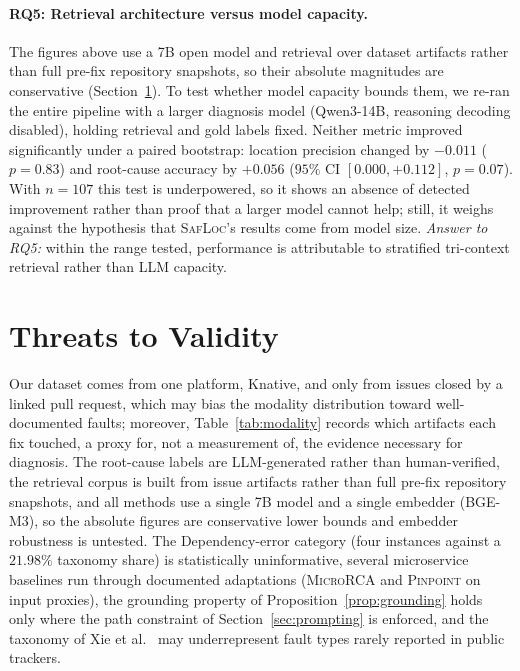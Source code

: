 \documentclass[runningheads]{llncs}
\begin{document}
\paragraph{RQ5: Retrieval architecture versus model capacity.} The figures above use a 7B open model and retrieval over dataset artifacts rather than full pre-fix repository snapshots, so their absolute magnitudes are conservative (Section~\ref{sec:threats}). To test whether model capacity bounds them, we re-ran the entire pipeline with a larger diagnosis model (Qwen3-14B, reasoning decoding disabled), holding retrieval and gold labels fixed. Neither metric improved significantly under a paired bootstrap: location precision changed by $-0.011$ ($p=0.83$) and root-cause accuracy by $+0.056$ ($95\%$ CI $[0.000,+0.112]$, $p=0.07$). With $n=107$ this test is underpowered, so it shows an absence of detected improvement rather than proof that a larger model cannot help; still, it weighs against the hypothesis that \textsc{SafLoc}'s results come from model size. \emph{Answer to RQ5:} within the range tested, performance is attributable to stratified tri-context retrieval rather than LLM capacity.

\section{Threats to Validity}
\label{sec:threats}

Our dataset comes from one platform, Knative, and only from issues closed by a linked pull request, which may bias the modality distribution toward well-documented faults; moreover, Table~\ref{tab:modality} records which artifacts each fix touched, a proxy for, not a measurement of, the evidence necessary for diagnosis. The root-cause labels are LLM-generated rather than human-verified, the retrieval corpus is built from issue artifacts rather than full pre-fix repository snapshots, and all methods use a single 7B model and a single embedder (BGE-M3), so the absolute figures are conservative lower bounds and embedder robustness is untested. The Dependency-error category (four instances against a $21.98\%$ taxonomy share) is statistically uninformative, several microservice baselines run through documented adaptations (\textsc{MicroRCA} and \textsc{Pinpoint} on input proxies), the grounding property of Proposition~\ref{prop:grounding} holds only where the path constraint of Section~\ref{sec:prompting} is enforced, and the taxonomy of Xie et al.~\cite{xie2025understanding} may underrepresent fault types rarely reported in public trackers.
\end{document}
